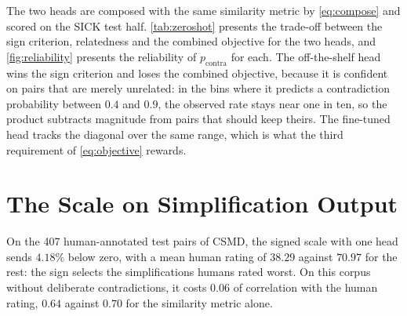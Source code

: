 \documentclass[11pt]{article}
\begin{document}


The two heads are composed with the same similarity metric by \autoref{eq:compose} and scored on the SICK test half.
\autoref{tab:zeroshot} presents the trade-off between the sign criterion, relatedness and the combined objective for the two heads, and \autoref{fig:reliability} presents the reliability of $p_{\mathrm{contra}}$ for each.
The off-the-shelf head wins the sign criterion and loses the combined objective, because it is confident on pairs that are merely unrelated: in the bins where it predicts a contradiction probability between $0.4$ and $0.9$, the observed rate stays near one in ten, so the product subtracts magnitude from pairs that should keep theirs.
The fine-tuned head tracks the diagonal over the same range, which is what the third requirement of \autoref{eq:objective} rewards.

\section{The Scale on Simplification Output}
\label{an:simplification}

On the 407 human-annotated test pairs of CSMD, the signed scale with one head sends $4.18\%$ below zero, with a mean human rating of $38.29$ against $70.97$ for the rest: the sign selects the simplifications humans rated worst.
On this corpus without deliberate contradictions, it costs $0.06$ of correlation with the human rating, $0.64$ against $0.70$ for the similarity metric alone.
\end{document}
